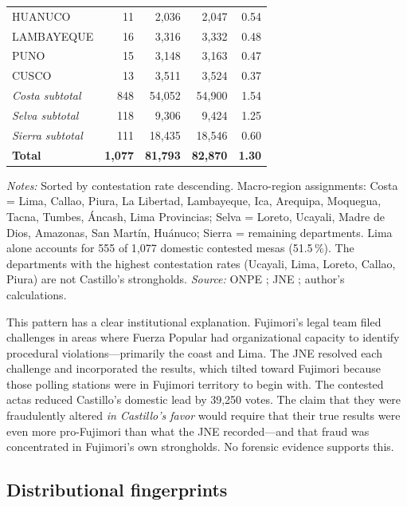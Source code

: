 \documentclass[12pt]{article}
\begin{document}
\begin{table}[H]
{\begin{tabular}{lrrrr}
HUANUCO        & 11  & 2,036 & 2,047 & 0.54 \\
LAMBAYEQUE     & 16  & 3,316 & 3,332 & 0.48 \\
PUNO           & 15  & 3,148 & 3,163 & 0.47 \\
CUSCO          & 13  & 3,511 & 3,524 & 0.37 \\
\midrule
\textit{Costa subtotal}  & 848 & 54,052 & 54,900 & 1.54 \\
\textit{Selva subtotal}  & 118 & 9,306  & 9,424  & 1.25 \\
\textit{Sierra subtotal} & 111 & 18,435 & 18,546 & 0.60 \\
\midrule
\textbf{Total} & \textbf{1,077} & \textbf{81,793} & \textbf{82,870} & \textbf{1.30} \\
\bottomrule
\end{tabular}%
}
\vspace{0.2cm}
\begin{minipage}{\textwidth}
\footnotesize
\textit{Notes:} Sorted by contestation rate descending. Macro-region
assignments: Costa = Lima, Callao, Piura, La Libertad, Lambayeque, Ica,
Arequipa, Moquegua, Tacna, Tumbes, \'Ancash, Lima Provincias;
Selva = Loreto, Ucayali, Madre de Dios, Amazonas, San Mart\'in, Hu\'anuco;
Sierra = remaining departments.
Lima alone accounts for 555 of 1,077 domestic contested mesas (51.5\,\%).
The departments with the highest contestation rates (Ucayali, Lima, Loreto,
Callao, Piura) are not Castillo's strongholds.
\textit{Source:} ONPE \citep{onpe2021}; JNE \citep{jne2021};
author's calculations.
\end{minipage}
\end{table}

This pattern has a clear institutional explanation. Fujimori's legal team
filed challenges in areas where Fuerza Popular had organizational capacity
to identify procedural violations---primarily the coast and Lima. The JNE
resolved each challenge and incorporated the results, which tilted toward
Fujimori because those polling stations were in Fujimori territory to begin
with. The contested actas reduced Castillo's domestic lead by 39,250 votes.
The claim that they were fraudulently altered \emph{in Castillo's favor} would
require that their true results were even more pro-Fujimori than what the
JNE recorded---and that fraud was concentrated in Fujimori's own strongholds.
No forensic evidence supports this.

\subsection{Distributional fingerprints}
\end{document}
